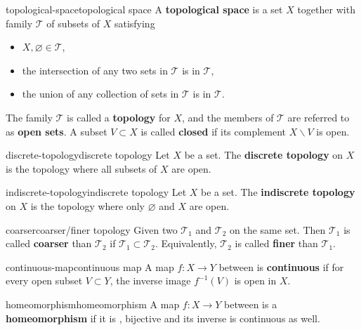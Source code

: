 \begin{topic}{topological-space}{topological space}
    A \textbf{topological space} is a set $X$ together with family $\mathcal{T}$ of subsets of $X$ satisfying
    \begin{itemize}
        \item $X, \varnothing \in \mathcal{T}$,
        \item the intersection of any two sets in $\mathcal{T}$ is in $\mathcal{T}$,
        \item the union of any collection of sets in $\mathcal{T}$ is in $\mathcal{T}$.
    \end{itemize}
    The family $\mathcal{T}$ is called a \textbf{topology} for $X$, and the members of $\mathcal{T}$ are referred to as \textbf{open sets}. A subset $V \subset X$ is called \textbf{closed} if its complement $X \backslash V$ is open.
\end{topic}

\begin{topic}{discrete-topology}{discrete topology}
    Let $X$ be a set. The \textbf{discrete topology} on $X$ is the topology where all subsets of $X$ are open.
\end{topic}

\begin{topic}{indiscrete-topology}{indiscrete topology}
    Let $X$ be a set. The \textbf{indiscrete topology} on $X$ is the topology where only $\varnothing$ and $X$ are open.
\end{topic}

\begin{topic}{coarser}{coarser/finer topology}
    Given two  $\mathcal{T}_1$ and $\mathcal{T}_2$ on the same set. Then $\mathcal{T}_1$ is called \textbf{coarser} than $\mathcal{T}_2$ if $\mathcal{T}_1 \subset \mathcal{T}_2$. Equivalently, $\mathcal{T}_2$ is called \textbf{finer} than $\mathcal{T}_1$.
\end{topic}

\begin{topic}{continuous-map}{continuous map}
    A map $f : X \to Y$ between  is \textbf{continuous} if for every open subset $V \subset Y$, the inverse image $f^{-1}(V)$ is open in $X$.
\end{topic}

\begin{topic}{homeomorphism}{homeomorphism}
    A map $f : X \to Y$ between  is a \textbf{homeomorphism} if it is , bijective and its inverse is continuous as well.
\end{topic}

